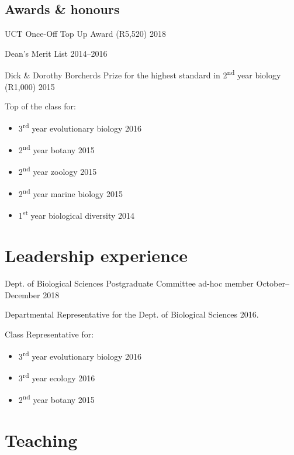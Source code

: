 \documentclass[]{article}
\providecommand{\tightlist}{%
  \setlength{\itemsep}{0pt}\setlength{\parskip}{0pt}}
\begin{document}
\hypertarget{awards-honours}{%
\subsection{Awards \& honours}\label{awards-honours}}

UCT Once-Off Top Up Award (R5,520) \hfill 2018

Dean's Merit List \hfill 2014--2016

Dick \& Dorothy Borcherds Prize for the highest standard in
2\textsuperscript{nd} year biology (R1,000) \hfill 2015

Top of the class for:

\begin{itemize}
\tightlist
\item
  3\textsuperscript{rd} year evolutionary biology \hfill 2016
\item
  2\textsuperscript{nd} year botany \hfill 2015
\item
  2\textsuperscript{nd} year zoology \hfill 2015
\item
  2\textsuperscript{nd} year marine biology \hfill 2015
\item
  1\textsuperscript{st} year biological diversity \hfill 2014
\end{itemize}

\hypertarget{leadership-experience}{%
\section{Leadership experience}\label{leadership-experience}}

Dept. of Biological Sciences Postgraduate Committee ad-hoc member
\hfill October--December 2018

Departmental Representative for the Dept. of Biological Sciences
\hfill 2016.

Class Representative for:

\begin{itemize}
\tightlist
\item
  3\textsuperscript{rd} year evolutionary biology \hfill 2016
\item
  3\textsuperscript{rd} year ecology \hfill 2016
\item
  2\textsuperscript{nd} year botany \hfill 2015
\end{itemize}

\hypertarget{teaching}{%
\section{Teaching}\label{teaching}}
\end{document}
